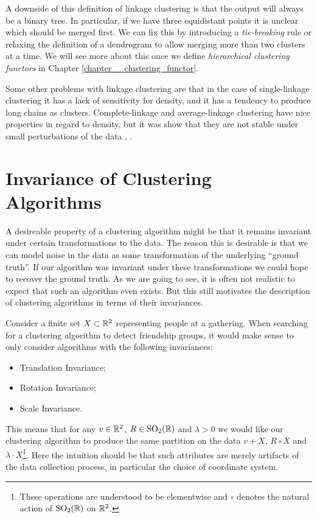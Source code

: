 A downside of this definition of linkage clustering is that the output will always be a binary tree. In particular, if we have three equidistant points it is unclear which should be merged first. We can fix this by introducing a \emph{tie-breaking} rule or relaxing the definition of a dendrogram to allow merging more than two clusters at a time. We will see more about this once 
we define \emph{hierarchical clustering functors} in Chapter \ref{chapter__clustering_functor}.

Some other problems with linkage clustering are that in the case of single-linkage clustering it has a lack of sensitivity for density, and it has a tendency to produce long chains as clusters. Complete-linkage and average-linkage clustering have nice properties in regard to density, but it was show that they are not stable under small perturbations of the data \cite[Sec.~3.6]{JMLR:v11:carlsson10a}, \cite{Lance1967-ci}.

\section{Invariance of Clustering Algorithms}
\label{seciton__preserving_structure}

A desireable property of a clustering algorithm might be that it remains invariant under certain transformations to the data.
The reason this is desirable is that we can model noise in the data as some transformation of the underlying ``ground truth''.
If our algorithm was invariant under these transformations we could hope to recover the ground truth. As we are going to see, it is often not realistic to expect that such an algorithm even exists. But this still motivates the description of clustering algorithms in terms of their invariances.

\begin{example}{}{}
Consider a finite set $X \subset \mathbb R^2$ representing people at a gathering. When searching for a clustering algorithm to detect friendship groups, it would make sense to only consider algorithms with the following invariances:
\begin{itemize}
    \item Translation Invariance;
    \item Rotation Invariance;
    \item Scale Invariance.
\end{itemize}
This means that for any $v \in \mathbb R^2$, $R \in \mathrm{SO}_2(\mathbb R)$ and $\lambda > 0$ we would like our clustering algorithm to produce the same partition on the data $v + X$, $R \circ X$ and $\lambda \cdot X$\footnote{These operations are understood to be elementwise and $\circ$ denotes the natural action of $\mathrm{SO}_2(\mathbb R)$ on $\mathbb R^2$.}. Here the intuition should be that such attributes are merely artifacts of the data collection process, in particular the choice of coordinate system.
\end{example}

